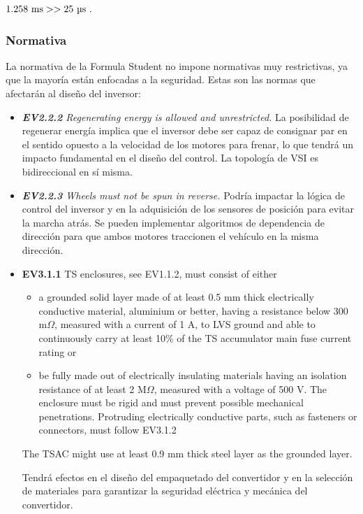 \(1.258 \text{ ms} >> 25 \text{ }\text{\unit{\micro\second} .}\)

\subsubsection{Normativa}
La normativa de la Formula Student no impone normativas muy restrictivas, ya que la mayoría están enfocadas a la seguridad. Estas son las normas que afectarán al diseño del inversor:

\begin{itemize}

    \item \textit{\textbf{EV2.2.2} Regenerating energy is allowed and unrestricted.} La posibilidad de regenerar energía implica que el inversor debe ser capaz de consignar par en el sentido opuesto a la velocidad de los motores para frenar, lo que tendrá un impacto fundamental en el diseño del control. La topología de VSI es bidireccional en sí misma.
    \item \textit{\textbf{EV2.2.3} Wheels must not be spun in reverse.} Podría impactar la lógica de control del inversor y en la adquisición de los sensores de posición para evitar la marcha atrás. Se pueden implementar algoritmos de dependencia de dirección para que ambos motores traccionen el vehículo en la misma dirección.
    \item \begin{itquote} \textbf{EV3.1.1} TS enclosures, see EV1.1.2, must consist of either
    \begin{itemize}
            \item a grounded solid layer made of at least 0.5 mm thick electrically conductive material, aluminium or better, having a resistance below 300 m$\Omega$, measured with a current of 1 A, to LVS ground and able to continuously carry at least 10\% of the TS accumulator main fuse current rating or 
            \item be fully made out of electrically insulating materials having an isolation resistance of at least 2 M$\Omega$, measured with a voltage of 500 V. The enclosure must be rigid and must prevent possible mechanical penetrations. Protruding electrically conductive parts, such as fasteners or connectors, must follow EV3.1.2
    \end{itemize} The TSAC might use at least 0.9 mm thick steel layer as the grounded layer. \end{itquote} Tendrá efectos en el diseño del empaquetado del convertidor y en la selección de materiales para garantizar la seguridad eléctrica y mecánica del convertidor.


\end{itemize}
